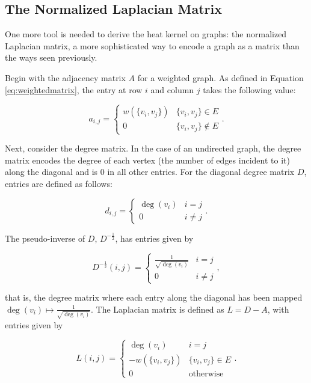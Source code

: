 \subsection{The Normalized Laplacian Matrix}

One more tool is needed to derive the heat kernel on graphs: the normalized Laplacian matrix, a more sophisticated way to encode a graph as a matrix than the ways seen previously.

Begin with the adjacency matrix \(A\) for a weighted graph. As defined in Equation \ref{eq:weightedmatrix}, the entry at row \(i\) and column \(j\) takes the following value:

\begin{equation}
	a_{i, j} = \begin{cases}
w(\{v_{i}, v_{j}\}) & \{v_{i}, v_{j}\} \in E\\
0 & \{v_{i}, v_{j}\} \not\in E
\end{cases}.
\end{equation}

\noindent Next, consider the degree matrix. In the case of an undirected graph, the degree matrix encodes the degree of each vertex (the number of edges incident to it) along the diagonal and is 0 in all other entries. For the diagonal degree matrix \(D\), entries are defined as follows:

\begin{equation}
	d_{i, j} = \begin{cases}
\deg(v_{i}) & i = j\\
0 & i \neq j
\end{cases}.
\end{equation}

\noindent The pseudo-inverse of \(D\), \(D^{-\frac{1}{2}}\), has entries given by

\begin{equation}
	D^{-\frac{1}{2}}(i, j) = \begin{cases}
\frac{1}{\sqrt{\deg(v_{i})}} & i = j\\
0 & i \neq j
\end{cases},
\end{equation}

\noindent that is, the degree matrix where each entry along the diagonal has been mapped \(\deg(v_{i}) \mapsto \frac{1}{\sqrt{\deg(v_{i})}}\). The Laplacian matrix is defined as \(L = D - A\), with entries given by

\begin{equation}
	L(i, j) = \begin{cases}
\deg(v_{i}) & i = j\\
-w(\{v_{i}, v_{j}\}) & \{v_{i}, v_{j}\} \in E\\
0 & \text{otherwise}
\end{cases}.
\end{equation}

